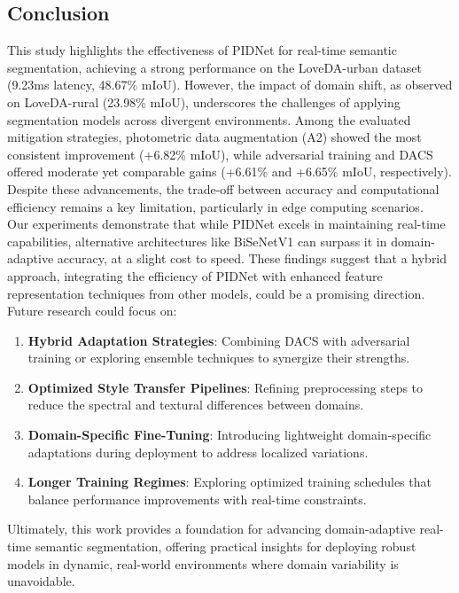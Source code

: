 \documentclass{article}
\begin{document}
\begin{multicols}{2}
\begin{table}[H]
		\end{table}

		\section{Conclusion}
		\justifying


		This study highlights the effectiveness of PIDNet for real-time semantic segmentation, achieving a strong performance on the LoveDA-urban dataset (9.23ms latency, 48.67\% mIoU). However, the impact of domain shift, as observed on LoveDA-rural (23.98\% mIoU), underscores the challenges of applying segmentation models across divergent environments. Among the evaluated mitigation strategies, photometric data augmentation (A2) showed the most consistent improvement (+6.82\% mIoU), while adversarial training and DACS offered moderate yet comparable gains (+6.61\% and +6.65\% mIoU, respectively). Despite these advancements, the trade-off between accuracy and computational efficiency remains a key limitation, particularly in edge computing scenarios. 
		\\
		Our experiments demonstrate that while PIDNet excels in maintaining real-time capabilities, alternative architectures like BiSeNetV1 can surpass it in domain-adaptive accuracy, at a slight cost to speed. These findings suggest that a hybrid approach, integrating the efficiency of PIDNet with enhanced feature representation techniques from other models, could be a promising direction.
		Future research could focus on:

		\begin{enumerate}
			\item \textbf {Hybrid Adaptation Strategies}: Combining DACS with adversarial training or exploring ensemble techniques to synergize their strengths.
			\item \textbf {Optimized Style Transfer Pipelines}: Refining preprocessing steps to reduce the spectral and textural differences between domains.
			\item \textbf {Domain-Specific Fine-Tuning}: Introducing lightweight domain-specific adaptations during deployment to address localized variations.
			\item \textbf {Longer Training Regimes}: Exploring optimized training schedules that balance performance improvements with real-time constraints.
		\end{enumerate}
		
		Ultimately, this work provides a foundation for advancing domain-adaptive real-time semantic segmentation, offering practical insights for deploying robust models in dynamic, real-world environments where domain variability is unavoidable.
		

		
	\end{multicols}
	
	
	
	
\end{document}
